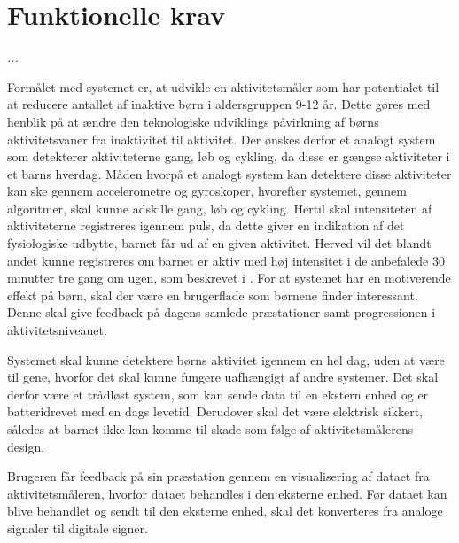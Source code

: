 \section{Funktionelle krav}\label{funktionellekrav}
\textit{...}

Formålet med systemet er, at udvikle en aktivitetsmåler som har potentialet til at reducere antallet af inaktive børn i aldersgruppen 9-12 år. Dette gøres med henblik på at ændre den teknologiske udviklings påvirkning af børns aktivitetsvaner fra inaktivitet til aktivitet.
Der ønskes derfor et analogt system som detekterer aktiviteterne gang, løb og cykling, da disse er gængse aktiviteter i et barns hverdag. Måden hvorpå et analogt system kan detektere disse aktiviteter kan ske gennem accelerometre og gyroskoper, hvorefter systemet, gennem algoritmer, skal kunne adskille gang, løb og cykling.
Hertil skal intensiteten af aktiviteterne registreres igennem puls, da dette giver en indikation af det fysiologiske udbytte, barnet får ud af en given aktivitet. Herved vil det blandt andet kunne registreres om barnet er aktiv med høj intensitet i de anbefalede 30 minutter tre gang om ugen, som beskrevet i . \newline
For at systemet har en motiverende effekt på børn, skal der være en brugerflade som børnene finder interessant. Denne skal give feedback på dagens samlede præstationer samt progressionen i aktivitetsniveauet.

Systemet skal kunne detektere børns aktivitet igennem en hel dag, uden at være til gene, hvorfor det skal kunne fungere uafhængigt af andre systemer. Det skal derfor være et trådløst system, som kan sende data til en ekstern enhed og er batteridrevet med en dags levetid. Derudover skal det være elektrisk sikkert, således at barnet ikke kan komme til skade som følge af aktivitetsmålerens design. 

Brugeren får feedback på sin præstation gennem en visualisering af dataet fra aktivitetsmåleren, hvorfor dataet behandles i den eksterne enhed. \newline
Før dataet kan blive behandlet og sendt til den eksterne enhed, skal det konverteres fra analoge signaler til digitale signer. 

